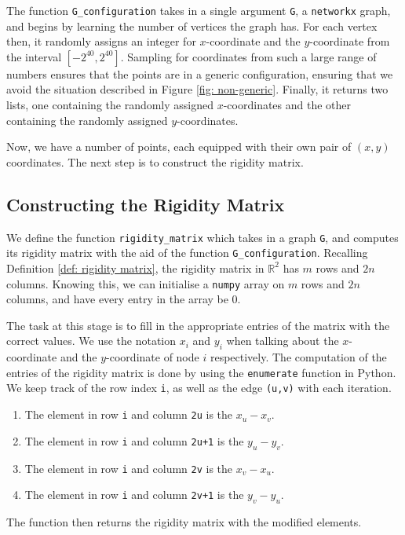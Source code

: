 \begin{flushleft}
The function \texttt{G\_configuration} takes in a single argument \texttt{G}, a \texttt{networkx} graph, and begins by learning the number of vertices the graph has. For each vertex then, it randomly assigns an integer for $x$-coordinate and the $y$-coordinate from the interval $[-2^{40}, 2^{40}]$. 
Sampling for coordinates from such a large range of numbers ensures that the points are in a generic configuration, ensuring that we avoid the situation described in Figure \ref{fig: non-generic}. Finally, it returns two lists, one containing the randomly assigned $x$-coordinates and the other containing the randomly assigned $y$-coordinates.
\end{flushleft}

\begin{flushleft}
Now, we have a number of points, each equipped with their own pair of $(x,y)$ coordinates. The next step is to construct the rigidity matrix.
\end{flushleft}

\subsection{Constructing the Rigidity Matrix}

\begin{flushleft}
We define the function \texttt{rigidity\_matrix} which takes in a graph \texttt{G}, and computes its rigidity matrix with the aid of the function \texttt{G\_configuration}. Recalling Definition \ref{def: rigidity matrix}, the rigidity matrix in $\mathbb{R}^2$ has $m$ rows and $2n$ columns. Knowing this, we can initialise a \texttt{numpy} array on $m$ rows and $2n$ columns, and have every entry in the array be 0.
\end{flushleft}

\begin{flushleft}
The task at this stage is to fill in the appropriate entries of the matrix with the correct values. We use the notation $x_i$ and $y_i$ when talking about the $x$-coordinate and the $y$-coordinate of node $i$ respectively. The computation of the entries of the rigidity matrix is done by using the \texttt{enumerate} function in Python. We keep track of the row index \texttt{i}, as well as the edge \texttt{(u,v)} with each iteration.
\begin{enumerate}
    \item The element in row \texttt{i} and column \texttt{2u} is the $x_u - x_v$.
    \vspace{-3mm}
    \item The element in row \texttt{i} and column \texttt{2u+1} is the $y_u - y_v$.
    \vspace{-3mm}
    \item The element in row \texttt{i} and column \texttt{2v} is the $x_v - x_u$.
    \vspace{-3mm}
    \item The element in row \texttt{i} and column \texttt{2v+1} is the $y_v - y_u$.
\end{enumerate}
The function then returns the rigidity matrix with the modified elements. 
\end{flushleft}

